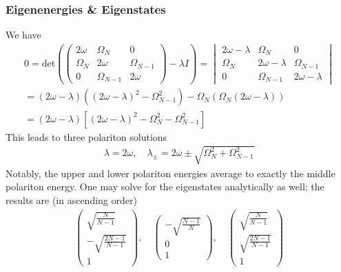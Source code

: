 \documentclass[10pt]{article}
\begin{document}
\subsubsection{Eigenenergies \& Eigenstates}
We have
\begin{gather*} 
    0 = \text{det} \left (\begin{pmatrix} 2 \omega & \Omega_{N} & 0 \\
        \Omega_{N} & 2\omega & \Omega_{N-1} \\
    0 & \Omega_{N-1} & 2\omega \end{pmatrix} - \lambda I\right ) = 
            \begin{vmatrix} 2 \omega - \lambda & \Omega_{N} & 0 \\
        \Omega_{N} & 2\omega - \lambda & \Omega_{N-1} \\
    0 & \Omega_{N-1} & 2\omega - \lambda\end{vmatrix} \\ = 
    (2\omega - \lambda)((2\omega - \lambda)^2 - \Omega_{N-1}^2) - 
    \Omega_{N}(\Omega_{N}(2\omega -\lambda)) \\ = 
    (2\omega - \lambda)[(2\omega -\lambda)^2 - \Omega_N^2 - 
    \Omega_{N-1}^2]
\end{gather*}
This leads to three polariton solutions
\begin{gather}
    \lambda = 2\omega , \quad 
    \lambda_{\pm} = 2\omega \pm \sqrt{\Omega_N^2 + \Omega_{N-1}^2} 
\end{gather}
Notably, the upper and lower polariton energies average to exactly the middle
polariton energy. One may solve for the eigenstates analytically as well; 
the results are (in ascending order) 
\begin{gather}
    \begin{pmatrix}
        \sqrt{\frac{N}{N-1}} \\
        -\sqrt{\frac{2N-1}{N-1}} \\
        1
    \end{pmatrix},
    \quad
    \begin{pmatrix}
        -\sqrt{\frac{N-1}{N }} \\
        0 \\
        1
    \end{pmatrix},
    \quad
    \begin{pmatrix}
        \sqrt{\frac{N}{N-1}} \\
        \sqrt{\frac{2N-1}{N-1}} \\
        1
    \end{pmatrix}
\end{gather}
\end{document}
